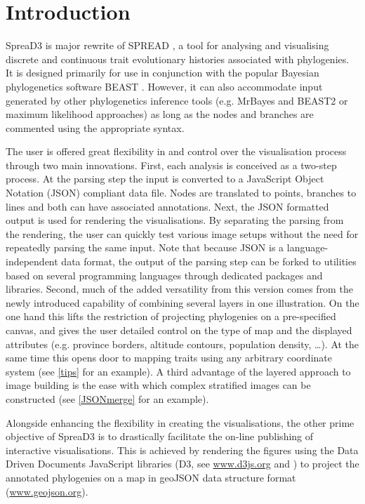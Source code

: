 \documentclass[english]{paper}
\begin{document}
\section{Introduction}
SpreaD3 is major rewrite of SPREAD \citep{bielejec11}, a tool for analysing and visualising discrete and continuous trait evolutionary histories associated with phylogenies.
It is designed primarily for use in conjunction with the popular Bayesian phylogenetics software BEAST \citep{drummond:2012zr}.
However, it can also accommodate input generated by other phylogenetics inference tools (e.g. MrBayes and BEAST2 or maximum likelihood approaches) as long as the nodes and branches are commented using the appropriate syntax.
\par
The user is offered great flexibility in and control over the visualisation process through two main innovations.
First, each analysis is conceived as a two-step process. 
At the parsing step the input is converted to a JavaScript Object Notation (JSON) compliant data file.
Nodes are translated to points, branches to lines and both can have associated annotations. 
Next, the JSON formatted output is used for rendering the visualisations.
By separating the parsing from the rendering, the user can quickly test various image setups without the need for repeatedly parsing the same input.
Note that because JSON is a language-independent data format, the output of the parsing step can be forked to utilities based on several programming languages through dedicated packages and libraries. %
Second, much of the added versatility from this version comes from the newly introduced capability of combining several layers in one illustration. On the one hand this lifts the restriction of projecting phylogenies on a pre-specified canvas, and gives the user detailed control on the type of map and the displayed %
attributes (e.g. province borders, altitude contours, population density, \dots). %
At the same time this opens door to mapping traits using any arbitrary coordinate system (see \ref{tips} for an example). 
A third advantage of the layered approach to image building is the ease with which complex stratified images can be constructed (see \ref{JSONmerge} for an example). 
\par
Alongside enhancing the flexibility in creating the visualisations, the other prime objective of SpreaD3 is to drastically facilitate the on-line publishing of interactive visualisations.
This is achieved by rendering the figures using the Data Driven Documents JavaScript libraries (D3, see \url{www.d3js.org} and \citet{Bostock:2011aa}) to project the annotated phylogenies on a map in geoJSON data structure format (\url{www.geojson.org}).
\end{document}
